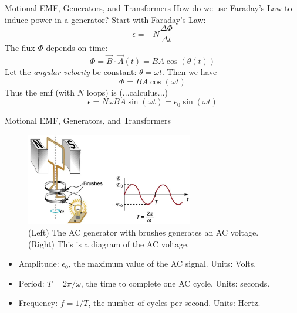 \documentclass{beamer}
\begin{document}
\begin{frame}{Motional EMF, Generators, and Transformers}
How do we use Faraday's Law to induce power in a generator?  Start with Faraday's Law:
\begin{equation}
\epsilon = - N\frac{\Delta \Phi}{\Delta t}
\end{equation}
The flux $\Phi$ depends on time:
\begin{equation}
\Phi = \vec{B} \cdot \vec{A}(t) = BA\cos(\theta(t))
\end{equation}
Let the \textit{angular velocity} be constant: $\theta = \omega t$.  Then we have
\begin{equation}
\Phi  = BA\cos(\omega t)
\end{equation}
Thus the emf (with $N$ loops) is (...calculus...)
\begin{equation}
\epsilon = N\omega BA \sin(\omega t) = \epsilon_0 \sin(\omega t)
\end{equation}
\end{frame}

\begin{frame}{Motional EMF, Generators, and Transformers}
\footnotesize
\begin{figure}
\centering
\includegraphics[width=0.65\textwidth]{figures/generator_1.png}
\caption{\label{fig:motion_emf2} (Left) The AC generator with brushes generates an AC voltage. (Right) This is a diagram of the AC voltage.}
\end{figure}
\begin{itemize}
\item Amplitude: $\epsilon_0$, the maximum value of the AC signal. Units: Volts.
\item Period: $T = 2\pi/\omega$, the time to complete one AC cycle.  Units: seconds.
\item Frequency: $f = 1/T$, the number of cycles per second.  Units: Hertz.
\end{itemize}
\end{frame}
\end{document}
